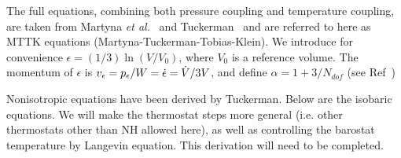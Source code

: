 \documentclass[11pt,a4paper,twoside]{article}
\begin{document}
The full equations, combining both pressure coupling and temperature
coupling, are taken from Martyna {\em et al.}~\cite{Martyna1996} and
Tuckerman~\cite{Tuckerman2006} and are referred to here as MTTK
equations (Martyna-Tuckerman-Tobias-Klein).  We introduce for
convenience $\epsilon = (1/3)\ln (V/V_0)$, where $V_0$ is a reference
volume.  The momentum of $\epsilon$ is $v_{\epsilon} = p_{\epsilon}/W =
\dot{\epsilon} = \dot{V}/3V$, and define $\alpha = 1 + 3/N_{dof}$ (see
Ref~\cite{Tuckerman2006})

Nonisotropic equations have been derived by Tuckerman.  Below are the
isobaric equations.  We will make the thermostat steps more general
(i.e. other thermostats other than NH allowed here), as well as
controlling the barostat temperature by Langevin equation.  This
derivation will need to be completed.
\end{document}
